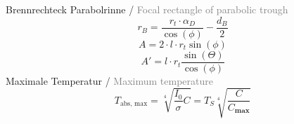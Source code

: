 \documentclass[12pt,a4paper]{article}
\def\gray#1{\textcolor{gray}{#1}}
\begin{document}
Brennrechteck Parabolrinne / \gray{Focal rectangle of parabolic trough}
\begin{equation}
    r_{B} = \frac{r_t \cdot \alpha_D}{\cos(\phi)} - \frac{d_{B}}{2}
\end{equation}
\begin{equation}
    A = 2 \cdot l \cdot r_t \sin(\phi)
\end{equation}
\begin{equation}
    A' = l \cdot r_t \frac{\sin(\Theta)}{\cos(\phi)}
\end{equation}
Maximale Temperatur / \gray{Maximum temperature}
\begin{equation}
    T_\text{abs, max} = \sqrt[4]{\frac{I_0}{\sigma}C} = T_S \sqrt[4]{\frac{C}{C_\textbf{max}}}
\end{equation}
%
\\
\end{document}
